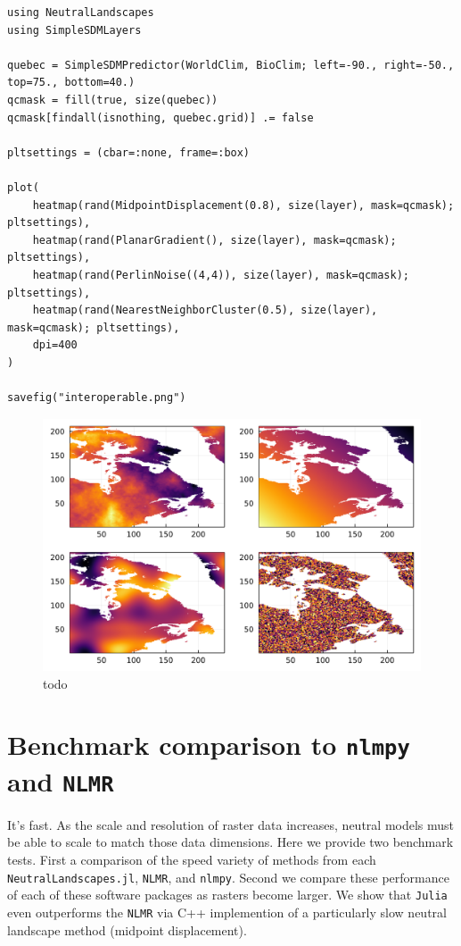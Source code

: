 \documentclass[11pt]{article}
\makeatletter
\def\maxwidth{\ifdim\Gin@nat@width>\linewidth\linewidth
\else\Gin@nat@width\fi}
\let\Oldincludegraphics\includegraphics
\renewcommand{\includegraphics}[1]{\Oldincludegraphics[width=\maxwidth]{#1}}
\makeatother
\begin{document}
\begin{verbatim}
using NeutralLandscapes
using SimpleSDMLayers

quebec = SimpleSDMPredictor(WorldClim, BioClim; left=-90., right=-50., top=75., bottom=40.)
qcmask = fill(true, size(quebec)) 
qcmask[findall(isnothing, quebec.grid)] .= false

pltsettings = (cbar=:none, frame=:box)

plot(
    heatmap(rand(MidpointDisplacement(0.8), size(layer), mask=qcmask); pltsettings),
    heatmap(rand(PlanarGradient(), size(layer), mask=qcmask); pltsettings),
    heatmap(rand(PerlinNoise((4,4)), size(layer), mask=qcmask); pltsettings),
    heatmap(rand(NearestNeighborCluster(0.5), size(layer), mask=qcmask); pltsettings),
    dpi=400
)

savefig("interoperable.png")
\end{verbatim}

\begin{figure}
\centering
\includegraphics{./figures/interoperable.png}
\caption{todo}
\end{figure}

\hypertarget{benchmark-comparison-to-nlmpy-and-nlmr}{%
\section{\texorpdfstring{Benchmark comparison to \texttt{nlmpy} and
\texttt{NLMR}}{Benchmark comparison to nlmpy and NLMR}}\label{benchmark-comparison-to-nlmpy-and-nlmr}}

It's fast. As the scale and resolution of raster data increases, neutral
models must be able to scale to match those data dimensions. Here we
provide two benchmark tests. First a comparison of the speed variety of
methods from each \texttt{NeutralLandscapes.jl}, \texttt{NLMR}, and
\texttt{nlmpy}. Second we compare these performance of each of these
software packages as rasters become larger. We show that \texttt{Julia}
even outperforms the \texttt{NLMR} via C++ implemention of a
particularly slow neutral landscape method (midpoint displacement).
\end{document}
